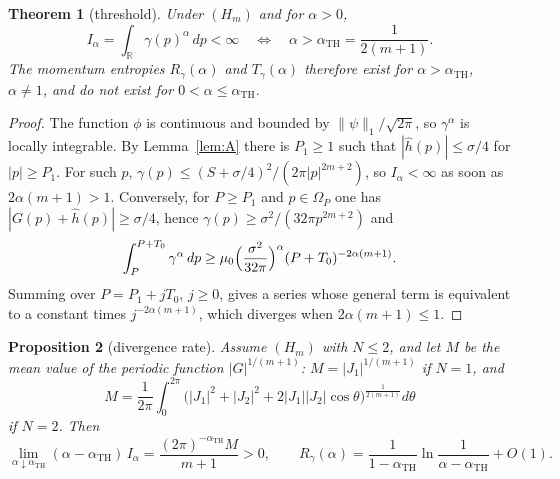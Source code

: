 \documentclass[11pt,a4paper]{article}
\newtheorem{theorem}{Theorem}
\newtheorem{proposition}[theorem]{Proposition}
\theoremstyle{definition}
\theoremstyle{plain}
\newcommand{\R}{\mathbb{R}}
\newcommand{\aTH}{\alpha_{\mathrm{TH}}}
\begin{document}
\begin{theorem}[threshold]\label{thm:threshold}
Under $(H_m)$ and for $\alpha>0$,
\[
I_\alpha=\int_\R\gamma(p)^\alpha\,dp<\infty
\quad\Longleftrightarrow\quad
\alpha>\aTH=\frac{1}{2(m+1)} .
\]
The momentum entropies $R_\gamma(\alpha)$ and $T_\gamma(\alpha)$ therefore
exist for $\alpha>\aTH$, $\alpha\neq1$, and do not exist for
$0<\alpha\le\aTH$.
\end{theorem}

\begin{proof}
The function $\phi$ is continuous and bounded by $\|\psi\|_1/\sqrt{2\pi}$, so
$\gamma^\alpha$ is locally integrable. By Lemma~\ref{lem:A} there is
$P_1\ge1$ such that $|\hat h(p)|\le\sigma/4$ for $|p|\ge P_1$. For such $p$,
$\gamma(p)\le(S+\sigma/4)^2/(2\pi|p|^{2m+2})$, so $I_\alpha<\infty$ as soon
as $2\alpha(m+1)>1$. Conversely, for $P\ge P_1$ and $p\in\Omega_P$ one has
$|G(p)+\hat h(p)|\ge\sigma/4$, hence $\gamma(p)\ge\sigma^2/(32\pi p^{2m+2})$
and
\[
\int_P^{P+T_0}\gamma^\alpha\,dp\ge\mu_0\Bigl(\frac{\sigma^2}{32\pi}\Bigr)^\alpha(P+T_0)^{-2\alpha(m+1)} .
\]
Summing over $P=P_1+jT_0$, $j\ge0$, gives a series whose general term is
equivalent to a constant times $j^{-2\alpha(m+1)}$, which diverges when
$2\alpha(m+1)\le1$.
\end{proof}

\begin{proposition}[divergence rate]\label{prop:rate}
Assume $(H_m)$ with $N\le2$, and let $M$ be the mean value of the periodic
function $|G|^{1/(m+1)}$: $M=|J_1|^{1/(m+1)}$ if $N=1$, and
\[
M=\frac1{2\pi}\int_0^{2\pi}\bigl(|J_1|^2+|J_2|^2+2|J_1||J_2|\cos\theta\bigr)^{\frac{1}{2(m+1)}}d\theta
\]
if $N=2$. Then
\[
\lim_{\alpha\downarrow\aTH}(\alpha-\aTH)\,I_\alpha=\frac{(2\pi)^{-\aTH}M}{m+1}>0,
\qquad
R_\gamma(\alpha)=\frac{1}{1-\aTH}\ln\frac{1}{\alpha-\aTH}+O(1) .
\]
\end{proposition}
\end{document}
